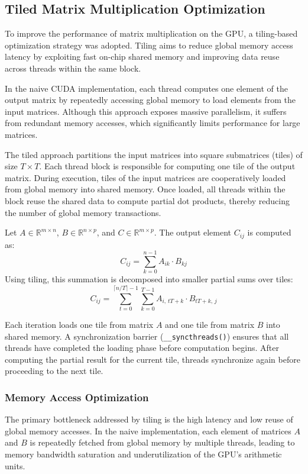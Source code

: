 \documentclass[conference, 12pt]{IEEEtran}
\begin{document}
\subsection{Tiled Matrix Multiplication Optimization}
To improve the performance of matrix multiplication on the GPU, a tiling-based optimization strategy was adopted. Tiling aims to reduce global memory access latency by exploiting fast on-chip shared memory and improving data reuse across threads within the same block.

In the naive CUDA implementation, each thread computes one element of the output matrix by repeatedly accessing global memory to load elements from the input matrices. Although this approach exposes massive parallelism, it suffers from redundant memory accesses, which significantly limits performance for large matrices.

The tiled approach partitions the input matrices into square submatrices (tiles) of size \( T \times T \). Each thread block is responsible for computing one tile of the output matrix. During execution, tiles of the input matrices are cooperatively loaded from global memory into shared memory. Once loaded, all threads within the block reuse the shared data to compute partial dot products, thereby reducing the number of global memory transactions.

Let \( A \in \mathbb{R}^{m \times n} \), \( B \in \mathbb{R}^{n \times p} \), and \( C \in \mathbb{R}^{m \times p} \). The output element \( C_{ij} \) is computed as:
\[
C_{ij} = \sum_{k=0}^{n-1} A_{ik} \cdot B_{kj}
\]
Using tiling, this summation is decomposed into smaller partial sums over tiles:
\[
C_{ij} = \sum_{t=0}^{\lceil n/T \rceil - 1} \sum_{k=0}^{T-1}
A_{i,\,tT+k} \cdot B_{tT+k,\,j}
\]

Each iteration loads one tile from matrix \( A \) and one tile from matrix \( B \) into shared memory. A synchronization barrier (\texttt{\_\_syncthreads()}) ensures that all threads have completed the loading phase before computation begins. After computing the partial result for the current tile, threads synchronize again before proceeding to the next tile.

\subsubsection{Memory Access Optimization}
The primary bottleneck addressed by tiling is the high latency and low reuse of global memory accesses. In the naive implementation, each element of matrices $A$ and $B$ is repeatedly fetched from global memory by multiple threads, leading to memory bandwidth saturation and underutilization of the GPU's arithmetic units.
\end{document}
